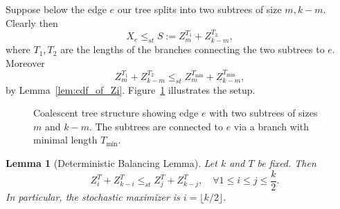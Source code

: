 \documentclass[10pt,oneside,reqno]{article}
\theoremstyle{plain}
\newtheorem{lemma}[theorem]{Lemma}
\theoremstyle{definition}
\numberwithin{equation}{section}
\renewcommand{\leq}{\leqslant}
\begin{document}
Suppose below the edge $e$ our tree splits into two subtrees of size $m, k-m$. Clearly then
%
\[X_e \leq_{st}  S := Z_{m}^{T_1} + Z_{k-m}^{T_2},\]
%
\noindent where $T_1, T_2$ are the lengths of the branches connecting the two subtrees 
to $e$.  Moreover
%
    \[Z_{m}^{T_1} + Z_{k-m}^{T_2} \leq_{st} Z_m^{T_{\mathrm{min}}} + Z_{k-m}^{T_{\mathrm{min}}},\]
%
\noindent by Lemma~\ref{lem:cdf_of_Zi}. Figure~\ref{fig:coalescent_tree} illustrates the setup.

\begin{figure}[t!]
\centering
{}
\caption{Coalescent tree structure showing edge $e$ with two subtrees of sizes $m$ and $k-m$. The subtrees are connected to $e$ via a branch with minimal length $T_{\mathrm{min}}$.}
\label{fig:coalescent_tree}
\end{figure}


\begin{lemma}[Deterministic Balancing Lemma] Let $k$ and $T$ be fixed. Then
    \[\quad Z^T_{i} + Z^T_{k-i} \leq_{st}  Z^T_{j} + Z^T_{k-j}, \quad\forall 1 \leq i \leq j \leq \frac{k}{2}.\]
    \noindent In particular, the stochastic maximizer is $i = \lfloor k/2\rfloor$. 
    \label{lem:deterministic_balancing_lemma}
\end{lemma}
\end{document}
